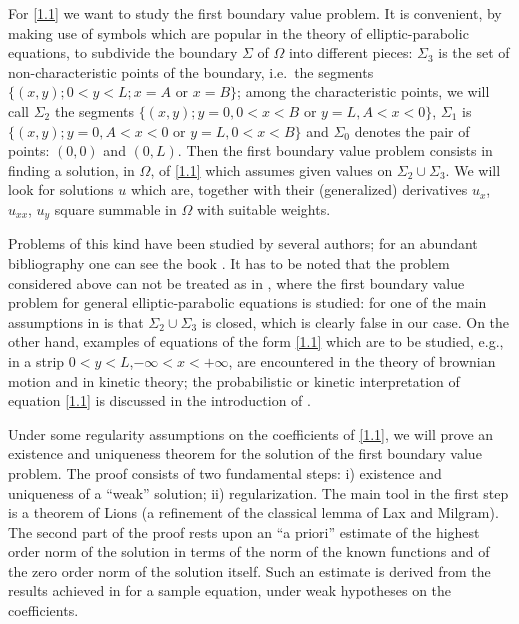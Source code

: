 \documentclass[a4paper,12pt,leqno]{article}
\numberwithin{equation}{section}
\begin{document}
For \cref{1.1} we want to study the first boundary value problem. It is convenient, by making use of symbols which are popular in the theory of elliptic-parabolic equations, to subdivide the boundary $\Sigma$ of $\Omega$ into different pieces: $\Sigma_{3}$ is the set of non-characteristic points of the boundary, i.e.\ the segments $\{(x, y); 0<y<L; x=A \text{ or } x=B\}$; among the characteristic points, we will call $\Sigma_{2}$ the segments $\{(x, y); y=0,0<x<B \text{ or } y=L, A<x<0\}$, $\Sigma_{1}$ is $\{(x, y); y=0, A<x<0 \text{ or }y=L, 0<x<B\}$ and $\Sigma_{0}$ denotes the pair of points: $(0,0)$ and $(0, L)$. Then the first boundary value problem consists in finding a solution, in $\Omega$, of \cref{1.1} which assumes given values on $\Sigma_{2} \cup \Sigma_{3}$. We will look for solutions $u$ which are, together with their (generalized) derivatives $u_{x}$, $u_{x x}$, $u_{y}$ square summable in $\Omega$ with suitable weights.

Problems of this kind have been studied by several authors; for an abundant bibliography one can see the book \cite{radkevic1973second}. It has to be noted that the problem considered above can not be treated as in \cite{zbMATH03245768}, where the first boundary value problem for general elliptic-parabolic equations is studied: for one of the main assumptions in \cite{zbMATH03245768} is that $\Sigma_{2} \cup \Sigma_{3}$ is closed, which is clearly false in our case. On the other hand, examples of equations of the form \eqref{1.1} which are to be studied, e.g., in a strip $0<y<L$,$-\infty<x<+\infty$, are encountered in the theory of brownian motion and in kinetic theory; the probabilistic or kinetic interpretation of equation \eqref{1.1} is discussed in the introduction of \cite{zbMATH03479447}.

Under some regularity assumptions on the coefficients of \cref{1.1}, we will prove an existence and uniqueness theorem for the solution of the first boundary value problem. The proof consists of two fundamental steps: i) existence and uniqueness of a ``weak'' solution; ii) regularization. The main tool in the first step is a theorem of Lions (a refinement of the classical lemma of Lax and Milgram). The second part of the proof rests upon an ``a priori'' estimate of the highest order norm of the solution in terms of the norm of the known functions and of the zero order norm of the solution itself. Such an estimate is derived from the results achieved in \cite{zbMATH03479447} for a sample equation, under weak hypotheses on the coefficients.
\end{document}
